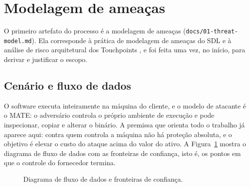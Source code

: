 \section{Modelagem de ameaças}
\label{sec:ameacas}

O primeiro artefato do processo é a modelagem de ameaças (\texttt{docs/01-threat-model.md}). Ela corresponde à prática de modelagem de ameaças do SDL \parencite{howard2006} e à análise de risco arquitetural dos Touchpoints \parencite{mcgraw2006}, e foi feita uma vez, no início, para derivar e justificar o escopo.

\subsection{Cenário e fluxo de dados}

O software executa inteiramente na máquina do cliente, e o modelo de atacante é o MATE: o adversário controla o próprio ambiente de execução e pode inspecionar, copiar e alterar o binário. A premissa que orienta todo o trabalho já aparece aqui: contra quem controla a máquina não há proteção absoluta, e o objetivo é elevar o custo do ataque acima do valor do ativo. A Figura~\ref{fig:dfd} mostra o diagrama de fluxo de dados com as fronteiras de confiança, isto é, os pontos em que o controle do fornecedor termina.

\begin{figure}[htbp]
\centering
{}
\caption{Diagrama de fluxo de dados e fronteiras de confiança.}
\label{fig:dfd}
\end{figure}

